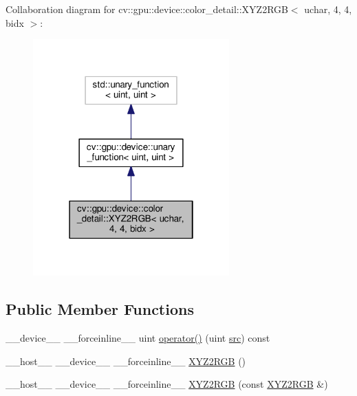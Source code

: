 Collaboration diagram for cv\-:\-:gpu\-:\-:device\-:\-:color\-\_\-detail\-:\-:X\-Y\-Z2\-R\-G\-B$<$ uchar, 4, 4, bidx $>$\-:\nopagebreak
\begin{figure}[H]
\begin{center}
\leavevmode
\includegraphics[width=214pt]{structcv_1_1gpu_1_1device_1_1color__detail_1_1XYZ2RGB_3_01uchar_00_014_00_014_00_01bidx_01_4__coll__graph}
\end{center}
\end{figure}
\subsection*{Public Member Functions}
\begin{DoxyCompactItemize}
\item 
\-\_\-\-\_\-device\-\_\-\-\_\- \-\_\-\-\_\-forceinline\-\_\-\-\_\- uint \hyperlink{structcv_1_1gpu_1_1device_1_1color__detail_1_1XYZ2RGB_3_01uchar_00_014_00_014_00_01bidx_01_4_a57a6275d45cc29210717ff3e33c39fc7}{operator()} (uint \hyperlink{legacy_8hpp_a371cd109b74033bc4366f584edd3dacc}{src}) const 
\item 
\-\_\-\-\_\-host\-\_\-\-\_\- \-\_\-\-\_\-device\-\_\-\-\_\- \-\_\-\-\_\-forceinline\-\_\-\-\_\- \hyperlink{structcv_1_1gpu_1_1device_1_1color__detail_1_1XYZ2RGB_3_01uchar_00_014_00_014_00_01bidx_01_4_a0340474cbd41986ae95459959b530806}{X\-Y\-Z2\-R\-G\-B} ()
\item 
\-\_\-\-\_\-host\-\_\-\-\_\- \-\_\-\-\_\-device\-\_\-\-\_\- \-\_\-\-\_\-forceinline\-\_\-\-\_\- \hyperlink{structcv_1_1gpu_1_1device_1_1color__detail_1_1XYZ2RGB_3_01uchar_00_014_00_014_00_01bidx_01_4_a70511afa442f27c7ff11b310e6d1a5d3}{X\-Y\-Z2\-R\-G\-B} (const \hyperlink{structcv_1_1gpu_1_1device_1_1color__detail_1_1XYZ2RGB}{X\-Y\-Z2\-R\-G\-B} \&)
\end{DoxyCompactItemize}



